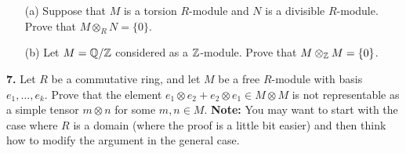 \documentclass[12pt]{amsart}
\begin{document}
\begin{itemize}
\item[(a)] Suppose that $M$ is a torsion $R$-module and $N$ is a divisible $R$-module.
Prove that $M\otimes_R N =\{0\}$.

\item[(b)] Let $M={\mathbb Q}/{\mathbb Z}$ considered as a ${\mathbb Z}$-module. Prove that
$M\otimes _{{\mathbb Z}} M=\{0\}$.
\end{itemize}

\skv
{\bf 7.} Let $R$ be a commutative ring, and let $M$ be a free 
$R$-module with basis $e_1,\ldots, e_k$. Prove that the element
$e_1\otimes e_2+e_2\otimes e_1\in M\otimes M$ is not representable as a simple tensor
$m\otimes n$ for some $m,n\in M$. {\bf Note:} You may want to start with the case where $R$ is a domain (where the proof is a little bit easier)
and then think how to modify the argument in the general case.
\end{document}
